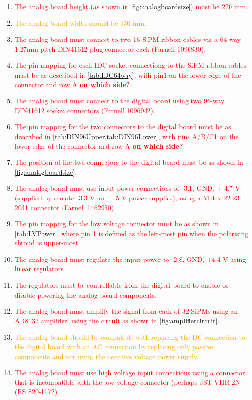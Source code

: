 \documentclass[a4paper]{article}
\newcommand{\must}[1]{\textcolor{red}{#1}}
\newcommand{\should}[1]{\textcolor{orange}{#1}}
\begin{document}
\begin{enumerate}
    \item \must{The analog board height (as shown in \cref{fig:analogboardsize}) must be 220 mm.}
    \item \should{The analog board width should be 150 mm.}
    \item \must{The analog board must connect to two 16-SiPM ribbon cables via a 64-way 1.27mm pitch DIN41612 plug connector each (Farnell 1096830).}
    \item \must{The pin mapping for each IDC socket connectiong to the SiPM ribbon cables must be as described in \cref{tab:IDC64way}, with pin1 on the lower edge of the connector and row A {\bf on which side?}.}
    \item \must{The analog board must connect to the digital board using two 96-way DIN41612 socket connectors (Farnell 1096942).}
    \item \must{The pin mapping for the two connectors to the digital board must be as described in \cref{tab:DIN96Upper,tab:DIN96Lower}, with pins A/B/C1 on the lower edge of the connector and row A {\bf on which side?}}
    \item \must{The position of the two connectors to the digital board must be as shown in \cref{fig:analogboardsize}.}
    \item \must{The analog board must use input power connections of -3.1, GND, + 4.7 V (supplied by remote -3.3 V and +5 V power supplies), using a Molex 22-23-2031 connector (Farnell 1462950).}
    \item \must{The pin mapping for the low voltage connector must be as shown in \cref{tab:LVPower}, where pin 1 is defined as the left-most pin when the polarising shroud is upper-most.}
    \item \must{The analog board must regulate the input power to -2.8, GND, +4.4 V using linear regulators.}
    \item \must{The regulators must be controllable from the digital board to enable or disable powering the analog board components.}
    \item \must{The analog board must amplify the signal from each of 32 SiPMs using an AD8132 amplifier, using the circuit as shown in \cref{fig:amplifiercircuit}.}
    \item \should{The analog board should be compatible with replacing the DC connection to the digital board with an AC connection by replacing only passive components and not using the negative voltage power supply.}
    \item \must{The analog board must use high voltage input connections using a connector that is incompatible with the low voltage connector (perhaps JST VHR-2N (RS 820-1172).}

\end{enumerate}
\end{document}
